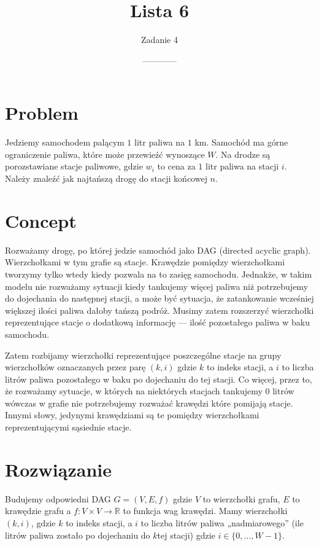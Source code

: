 \documentclass[14pt]{article}
\title{Lista 6}
\author{Zadanie 4}
\date{------------}
\begin{document}
\maketitle

\section{Problem}

Jedziemy samochodem palącym $1$ litr paliwa na $1$ km. Samochód ma górne ograniczenie paliwa, które może przewieźć wynoszące $W$. Na drodze są porozstawiane stacje paliwowe, gdzie $w_i$ to cena za $1$ litr paliwa na stacji $i$.
Należy znaleźć jak najtańszą drogę do stacji końcowej $n$.

\section{Concept}

Rozważamy drogę, po której jedzie samochód jako DAG (directed acyclic graph). Wierzchołkami w tym grafie są stacje. Krawędzie pomiędzy wierzchołkami tworzymy tylko wtedy kiedy pozwala na to zasięg samochodu. Jednakże, w takim modelu nie rozważamy sytuacji kiedy tankujemy więcej paliwa niż potrzebujemy do dojechania do następnej stacji, a może być sytuacja, że zatankowanie wcześniej większej ilości paliwa dałoby tańszą podróż. Musimy zatem rozszerzyć wierzchołki reprezentujące stacje o dodatkową informację — ilość pozostałego paliwa w baku samochodu.

Zatem rozbijamy wierzchołki reprezentujące poszczególne stacje na grupy wierzchołków oznaczanych przez parę $(k,i)$ gdzie $k$ to indeks stacji, a $i$ to liczba litrów paliwa pozostałego w baku po dojechaniu do tej stacji. Co więcej, przez to, że rozważamy sytuacje, w których na niektórych stacjach tankujemy 0 litrów wówczas w grafie nie potrzebujemy rozważać krawędzi które pomijają stacje. Innymi słowy, jedynymi krawędziami są te pomiędzy wierzchołkami reprezentującymi sąsiednie stacje.

\section{Rozwiązanie}

Budujemy odpowiedni DAG $G=(V,E,f)$ gdzie $V$ to wierzchołki grafu, $E$ to krawędzie grafu a $f:V\times V \to \mathbb{R}$ to funkcja wag krawędzi.
Mamy wierzchołki $(k,i)$, gdzie $k$ to indeks stacji, a $i$ to liczba litrów paliwa „nadmiarowego” (ile litrów paliwa zostało po dojechaniu do $k$tej stacji) gdzie $i\in \{0,\dots,W-1\}$.
\end{document}

